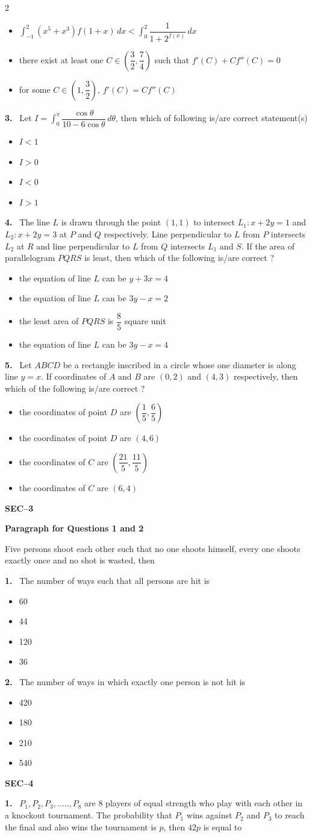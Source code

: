 \documentclass[10pt]{extarticle}
\newcommand{\sect}[1]{\par\smallskip\noindent\textbf{#1}\par}
\newcommand{\qn}[1]{\par\smallskip\noindent\textbf{#1.}~}
\newcommand{\paraq}[2]{\par\smallskip\noindent\textbf{Paragraph for Questions #1 and #2}\par}
\newenvironment{qoptions}{\begin{itemize}[leftmargin=1.8em,itemsep=1pt,topsep=2pt,label={}]}{\end{itemize}}
\newcommand{\opt}[2]{\item[(#1)] #2}
\begin{document}
\begin{multicols}{2}
\begin{qoptions}
\opt{B}{$\displaystyle\int_{-1}^{2}\left(x^5+x^3\right)f(1+x)\,dx<\int_0^2\dfrac1{1+2^{f(x)}}\,dx$}
\opt{C}{there exist at least one $C\in\left(\dfrac32,\dfrac74\right)$ such that $f'(C)+Cf''(C)=0$}
\opt{D}{for some $C\in\left(1,\dfrac32\right)$, $f'(C)=Cf''(C)$}
\end{qoptions}
\qn{3} Let $I=\displaystyle\int_0^{\pi}\dfrac{\cos\theta}{10-6\cos\theta}\,d\theta$, then which of following is/are correct statement(s)
\begin{qoptions}
\opt{A}{$I<1$}
\opt{B}{$I>0$}
\opt{C}{$I<0$}
\opt{D}{$I>1$}
\end{qoptions}
\qn{4} The line $L$ is drawn through the point $(1,1)$ to intersect $L_1: x+2y=1$ and $L_2: x+2y=3$ at $P$ and $Q$ respectively. Line perpendicular to $L$ from $P$ intersects $L_2$ at $R$ and line perpendicular to $L$ from $Q$ intersects $L_1$ and $S$. If the area of parallelogram $PQRS$ is least, then which of the following is/are correct ?
\begin{qoptions}
\opt{A}{the equation of line $L$ can be $y+3x=4$}
\opt{B}{the equation of line $L$ can be $3y-x=2$}
\opt{C}{the least area of $PQRS$ is $\dfrac85$ square unit}
\opt{D}{the equation of line $L$ can be $3y-x=4$}
\end{qoptions}
\qn{5} Let $ABCD$ be a rectangle inscribed in a circle whose one diameter is along line $y=x$. If coordinates of $A$ and $B$ are $(0,2)$ and $(4,3)$ respectively, then which of the following is/are correct ?
\begin{qoptions}
\opt{A}{the coordinates of point $D$ are $\left(\dfrac15,\dfrac65\right)$}
\opt{B}{the coordinates of point $D$ are $(4,6)$}
\opt{C}{the coordinates of $C$ are $\left(\dfrac{21}5,\dfrac{11}5\right)$}
\opt{D}{the coordinates of $C$ are $(6,4)$}
\end{qoptions}
\sect{SEC--3}
\paraq{1}{2}
Five persons shoot each other such that no one shoots himself, every one shoots exactly once and no shot is wasted, then
\qn{1} The number of ways such that all persons are hit is
\begin{qoptions}
\opt{A}{60}
\opt{B}{44}
\opt{C}{120}
\opt{D}{36}
\end{qoptions}
\qn{2} The number of ways in which exactly one person is not hit is
\begin{qoptions}
\opt{A}{420}
\opt{B}{180}
\opt{C}{210}
\opt{D}{540}
\end{qoptions}
\sect{SEC--4}
\qn{1} $P_1,P_2,P_3,\ldots..,P_8$ are 8 players of equal strength who play with each other in a knockout tournament. The probability that $P_1$ wins against $P_2$ and $P_3$ to reach the final and also wins the tournament is $p$, then $42p$ is equal to

\end{multicols}
\end{document}
